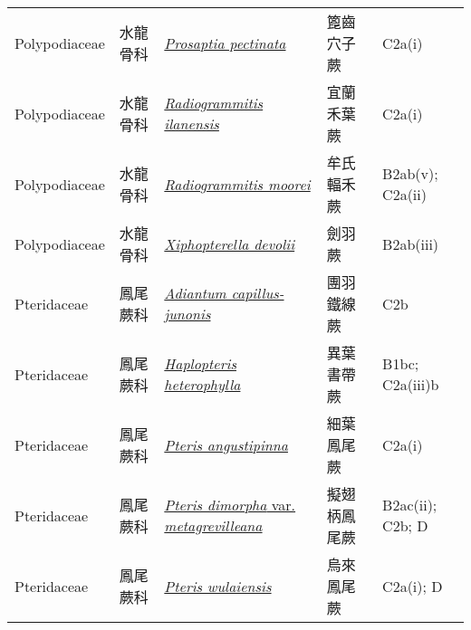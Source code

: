 {\begin{longtable}{p{2.5cm}p{2.5cm}p{4.5cm}p{2.5cm}p{3cm}}
    Polypodiaceae & 水龍骨科 & \href{http://www.theplantlist.org/tpl1.1/search?q=Prosaptia+pectinata}{\textit{Prosaptia pectinata} } & 篦齒穴子蕨 & C2a(i) \index{Prosaptia@\textit{Prosaptia}!pectinata@\textit{pectinata}}  \index{篦齒穴子蕨} \\
    Polypodiaceae & 水龍骨科 & \href{http://www.theplantlist.org/tpl1.1/search?q=Radiogrammitis+ilanensis}{\textit{Radiogrammitis ilanensis} } & 宜蘭禾葉蕨 & C2a(i) \index{Radiogrammitis@\textit{Radiogrammitis}!ilanensis@\textit{ilanensis}}  \index{宜蘭禾葉蕨} \\
    Polypodiaceae & 水龍骨科 & \href{http://www.theplantlist.org/tpl1.1/search?q=Radiogrammitis+moorei}{\textit{Radiogrammitis moorei} } & 牟氏輻禾蕨 & B2ab(v); C2a(ii) \index{Radiogrammitis@\textit{Radiogrammitis}!moorei@\textit{moorei}}  \index{牟氏輻禾蕨} \\
    Polypodiaceae & 水龍骨科 & \href{http://www.theplantlist.org/tpl1.1/search?q=Xiphopterella+devolii}{\textit{Xiphopterella devolii} } & 劍羽蕨 & B2ab(iii) \index{Xiphopterella@\textit{Xiphopterella}!devolii@\textit{devolii}}  \index{劍羽蕨} \\
    Pteridaceae & 鳳尾蕨科 & \href{http://www.theplantlist.org/tpl1.1/search?q=Adiantum+capillus-junonis}{\textit{Adiantum capillus-junonis} } & 團羽鐵線蕨 & C2b \index{Adiantum@\textit{Adiantum}!capillus-junonis@\textit{capillus-junonis}}  \index{團羽鐵線蕨} \\
    Pteridaceae & 鳳尾蕨科 & \href{http://www.theplantlist.org/tpl1.1/search?q=Haplopteris+heterophylla}{\textit{Haplopteris heterophylla} } & 異葉書帶蕨 & B1bc; C2a(iii)b \index{Haplopteris@\textit{Haplopteris}!heterophylla@\textit{heterophylla}}  \index{異葉書帶蕨} \\
    Pteridaceae & 鳳尾蕨科 & \href{http://www.theplantlist.org/tpl1.1/search?q=Pteris+angustipinna}{\textit{Pteris angustipinna} } & 細葉鳳尾蕨 & C2a(i) \index{Pteris@\textit{Pteris}!angustipinna@\textit{angustipinna}}  \index{細葉鳳尾蕨} \\
    Pteridaceae & 鳳尾蕨科 & \href{http://www.theplantlist.org/tpl1.1/search?q=Pteris+dimorpha+var.+metagrevilleana}{\textit{Pteris dimorpha} var. \textit{metagrevilleana} } & 擬翅柄鳳尾蕨 & B2ac(ii); C2b; D \index{Pteris@\textit{Pteris}!dimorpha@\textit{dimorpha}!var. metagrevilleana@var. \textit{metagrevilleana}}  \index{擬翅柄鳳尾蕨} \\
    Pteridaceae & 鳳尾蕨科 & \href{http://www.theplantlist.org/tpl1.1/search?q=Pteris+wulaiensis}{\textit{Pteris wulaiensis} } & 烏來鳳尾蕨 & C2a(i); D \index{Pteris@\textit{Pteris}!wulaiensis@\textit{wulaiensis}}  \index{烏來鳳尾蕨} \\

\end{longtable}}
